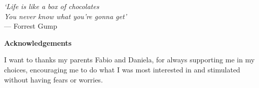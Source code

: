 \thispagestyle{empty}

\begin{flushright}
    \textsl{`Life is like a box of chocolates\\You never know what you're gonna get'}
    \\
    \medskip
    --- Forrest Gump
\end{flushright}


\bigskip

\begin{center}
    \textbf{Acknowledgements}
\end{center}

\noindent I want to thanks my parents Fabio and Daniela, for always supporting me in my choices, encouraging me to do what I was most interested in and stimulated without having fears or worries.





